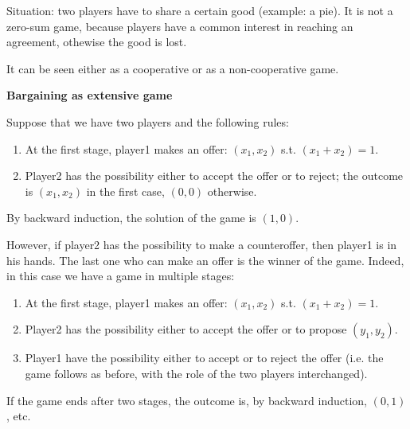 
%



\noindent Situation: two players have to share a certain good (example: a pie). It is not a zero-sum game, because players have a common interest in reaching an agreement, othewise the good is lost.

\noindent It can be seen either as a cooperative or as a non-cooperative game.

\bigskip
\noindent \textbf{Bargaining as extensive game}

\noindent Suppose that we have two players and the following rules:
\begin{enumerate}
	\item At the first stage, player1 makes an offer: $(x_1,x_2)$ s.t. $(x_1+ x_2) = 1$.
	\item Player2 has the possibility either to accept the offer or to reject; the outcome is $(x_1,x_2)$ in the first case, $(0,0)$ otherwise.
\end{enumerate}

\noindent By backward induction, the solution of the game is $(1,0)$.

\noindent However, if player2 has the possibility to make a counteroffer, then player1 
is in his hands. The last one who can make an offer is the winner of the game. Indeed, in this case we have a game in multiple stages:
\begin{enumerate}
	\item At the first stage, player1 makes an offer: $(x_1,x_2)$ s.t. $(x_1+ x_2) = 1$.
	\item Player2 has the possibility either to accept the offer or to propose $(y_1,y_2)$.
	\item Player1 have the possibility either to accept or to reject the offer (i.e. the game follows as before, with the role of the two players interchanged).
\end{enumerate}

\noindent If the game ends after two stages, the outcome is, by backward induction, $(0,1)$, etc.

